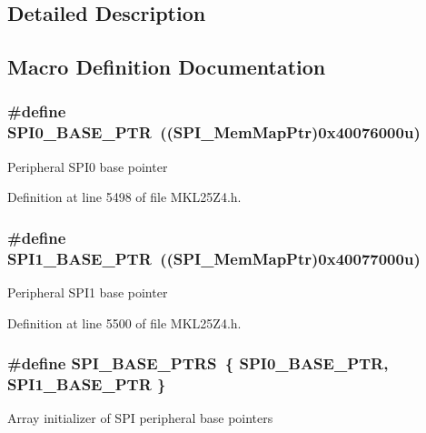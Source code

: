 \subsection{Detailed Description}


\subsection{Macro Definition Documentation}
\subsubsection[{\texorpdfstring{S\+P\+I0\+\_\+\+B\+A\+S\+E\+\_\+\+P\+TR}{SPI0_BASE_PTR}}]{\setlength{\rightskip}{0pt plus 5cm}\#define S\+P\+I0\+\_\+\+B\+A\+S\+E\+\_\+\+P\+TR~(({\bf S\+P\+I\+\_\+\+Mem\+Map\+Ptr})0x40076000u)}\hypertarget{group___s_p_i___peripheral_ga851f64a97b5919c1f99a34db5918b3b4}{}\label{group___s_p_i___peripheral_ga851f64a97b5919c1f99a34db5918b3b4}
Peripheral S\+P\+I0 base pointer 

Definition at line 5498 of file M\+K\+L25\+Z4.\+h.

\subsubsection[{\texorpdfstring{S\+P\+I1\+\_\+\+B\+A\+S\+E\+\_\+\+P\+TR}{SPI1_BASE_PTR}}]{\setlength{\rightskip}{0pt plus 5cm}\#define S\+P\+I1\+\_\+\+B\+A\+S\+E\+\_\+\+P\+TR~(({\bf S\+P\+I\+\_\+\+Mem\+Map\+Ptr})0x40077000u)}\hypertarget{group___s_p_i___peripheral_gae28fd789e0602a32076c1c13ca39f5af}{}\label{group___s_p_i___peripheral_gae28fd789e0602a32076c1c13ca39f5af}
Peripheral S\+P\+I1 base pointer 

Definition at line 5500 of file M\+K\+L25\+Z4.\+h.

\subsubsection[{\texorpdfstring{S\+P\+I\+\_\+\+B\+A\+S\+E\+\_\+\+P\+T\+RS}{SPI_BASE_PTRS}}]{\setlength{\rightskip}{0pt plus 5cm}\#define S\+P\+I\+\_\+\+B\+A\+S\+E\+\_\+\+P\+T\+RS~\{ {\bf S\+P\+I0\+\_\+\+B\+A\+S\+E\+\_\+\+P\+TR}, {\bf S\+P\+I1\+\_\+\+B\+A\+S\+E\+\_\+\+P\+TR} \}}\hypertarget{group___s_p_i___peripheral_ga3a16fecfe27c2052ab60e014be3f66f6}{}\label{group___s_p_i___peripheral_ga3a16fecfe27c2052ab60e014be3f66f6}
Array initializer of S\+PI peripheral base pointers 

